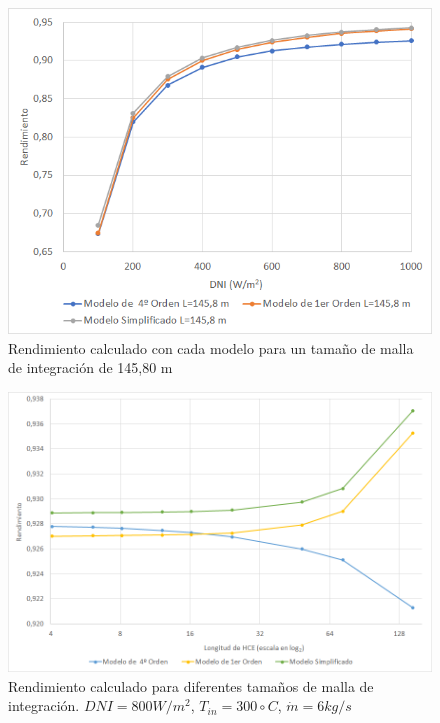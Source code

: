\begin{figure}[!h]
\includegraphics[width=0.9\linewidth]{images/malla14580.png}
\caption{Rendimiento calculado con cada modelo para un tamaño de malla de integración de 145,80 m} 
\label{fig:malla14580}
\end{figure}



\begin{figure}[!h]
\includegraphics[width=0.9\linewidth]{images/malla_variable_DNI_800.png}
\caption{Rendimiento calculado para diferentes tamaños de malla de integración. $DNI=800 W/m^2$, $T_{in}=300 \circ C$, $\dot m = 6 kg/s$} 
\label{fig:malla_variable_DNI_800}
\end{figure}






